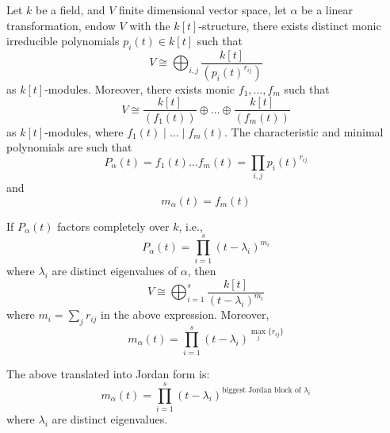 \documentclass[openany]{book}
\begin{document}
\begin{prop}
    Let $k$ be a field, and $V$ finite dimensional vector space, let $\alpha$ be a linear transformation, endow $V$ with the $k[t]$-structure, there exists distinct monic irreducible polynomials $p_i(t)\in k[t]$ such that 
    \begin{equation*}
        V\cong\bigoplus_{i,j}\frac{k[t]}{(p_i(t)^{r_{ij}})}
    \end{equation*}
    as $k[t]$-modules. Moreover, there exists monic $f_1,\dots, f_m$ such that 
    \begin{equation*}
        V\cong\frac{k[t]}{(f_1(t))}\oplus\dots\oplus\frac{k[t]}{(f_m(t))}
    \end{equation*}
    as $k[t]$-modules, where $f_1(t)\mid\dots\mid f_m(t)$. The characteristic and minimal polynomials are such that 
    \begin{equation*}
        P_\alpha(t)=f_1(t)\dots f_m(t)=\prod_{i,j}p_i(t)^{r_{ij}}
    \end{equation*}
    and 
    \begin{equation*}
        m_\alpha(t)=f_m(t)
    \end{equation*}
\end{prop}

\begin{prop}
    If $P_\alpha(t)$ factors completely over $k$, i.e., 
    \begin{equation*}
        P_\alpha(t)=\prod_{i=1}^s(t-\lambda_i)^{m_i}
    \end{equation*}
    where $\lambda_i$ are distinct eigenvalues of $\alpha$, then
    \begin{equation*}
        V\cong\bigoplus_{i=1}^s\frac{k[t]}{(t-\lambda_i)^{m_i}}
    \end{equation*}
    where $m_i=\sum_jr_{ij}$ in the above expression. Moreover, 
    \begin{equation*}
        m_\alpha(t)=\prod_{i=1}^s(t-\lambda_i)^{\max_j\{r_{ij}\}}
    \end{equation*}
\end{prop}


\begin{thm}
    The above translated into Jordan form is:
    \begin{equation*}
        m_\alpha(t)=\prod_{i=1}^s(t-\lambda_i)^{\text{biggest Jordan block of $\lambda_i$}}
    \end{equation*}
    where $\lambda_i$ are distinct eigenvalues. 
\end{thm}
\end{document}
